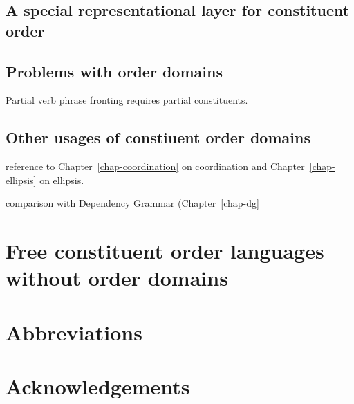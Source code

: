 \documentclass[output=paper]{langsci/langscibook}
\begin{document}
\subsection{A special representational layer for constituent order}

\citet{Reape94a,Kathol2001a,Mueller2004b}

\subsection{Problems with order domains}

Partial verb phrase fronting requires partial constituents.

\citep{Kathol2001a,MuellerGS}

\subsection{Other usages of constiuent order domains}

reference to Chapter~\ref{chap-coordination} on coordination and Chapter~\ref{chap-ellipsis} on ellipsis.

comparison with Dependency Grammar (Chapter~\ref{chap-dg}

\section{Free constituent order languages without order domains}

\citet{Bender2008a}


 
\section*{Abbreviations}
\section*{Acknowledgements}

\printbibliography[heading=subbibliography,notkeyword=this] 
\end{document}
